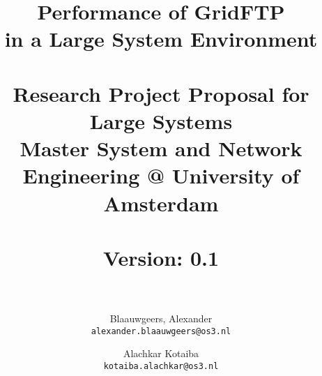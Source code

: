 \documentclass[a4paper, 12pt, one column]{article}
\title{ Performance of GridFTP\\ in a Large System Environment  \\~\\
\large Research Project Proposal for Large Systems
\\Master System and Network Engineering @ University of Amsterdam\\~\\
\textbf{Version:} 0.1\\~\\}
\author{Blaauwgeers, Alexander \\ \texttt{alexander.blaauwgeers@os3.nl} \and Alachkar Kotaiba  \\ \texttt{kotaiba.alachkar@os3.nl}}
\begin{document}
\maketitle
\clearpage





















\nocite{*}
\printbibliography
\end{document}
